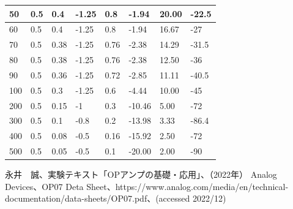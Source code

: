 \documentclass[dvipdfmx,titlepage,a4j]{jsarticle}  %
\begin{document}
\begin{table}[H]
\begin{tabular}{ll|ll|llll}
  \multicolumn{1}{|l|}{50}           & 0.5         & \multicolumn{1}{l|}{0.4}         & -1.25           & \multicolumn{1}{l|}{0.8}     & \multicolumn{1}{l|}{-1.94}           & \multicolumn{1}{l|}{20.00}           & \multicolumn{1}{l|}{-22.5}          \\ \hline
  \multicolumn{1}{|l|}{60}           & 0.5         & \multicolumn{1}{l|}{0.4}         & -1.25           & \multicolumn{1}{l|}{0.8}     & \multicolumn{1}{l|}{-1.94}           & \multicolumn{1}{l|}{16.67}           & \multicolumn{1}{l|}{-27}            \\ \hline
  \multicolumn{1}{|l|}{70}           & 0.5         & \multicolumn{1}{l|}{0.38}        & -1.25           & \multicolumn{1}{l|}{0.76}    & \multicolumn{1}{l|}{-2.38}           & \multicolumn{1}{l|}{14.29}           & \multicolumn{1}{l|}{-31.5}          \\ \hline
  \multicolumn{1}{|l|}{80}           & 0.5         & \multicolumn{1}{l|}{0.38}        & -1.25           & \multicolumn{1}{l|}{0.76}    & \multicolumn{1}{l|}{-2.38}           & \multicolumn{1}{l|}{12.50}           & \multicolumn{1}{l|}{-36}            \\ \hline
  \multicolumn{1}{|l|}{90}           & 0.5         & \multicolumn{1}{l|}{0.36}        & -1.25           & \multicolumn{1}{l|}{0.72}    & \multicolumn{1}{l|}{-2.85}           & \multicolumn{1}{l|}{11.11}           & \multicolumn{1}{l|}{-40.5}          \\ \hline
  \multicolumn{1}{|l|}{100}          & 0.5         & \multicolumn{1}{l|}{0.3}         & -1.25           & \multicolumn{1}{l|}{0.6}     & \multicolumn{1}{l|}{-4.44}           & \multicolumn{1}{l|}{10.00}           & \multicolumn{1}{l|}{-45}            \\ \hline
  \multicolumn{1}{|l|}{200}          & 0.5         & \multicolumn{1}{l|}{0.15}        & -1              & \multicolumn{1}{l|}{0.3}     & \multicolumn{1}{l|}{-10.46}          & \multicolumn{1}{l|}{5.00}            & \multicolumn{1}{l|}{-72}            \\ \hline
  \multicolumn{1}{|l|}{300}          & 0.5         & \multicolumn{1}{l|}{0.1}         & -0.8            & \multicolumn{1}{l|}{0.2}     & \multicolumn{1}{l|}{-13.98}          & \multicolumn{1}{l|}{3.33}            & \multicolumn{1}{l|}{-86.4}          \\ \hline
  \multicolumn{1}{|l|}{400}          & 0.5         & \multicolumn{1}{l|}{0.08}        & -0.5            & \multicolumn{1}{l|}{0.16}    & \multicolumn{1}{l|}{-15.92}          & \multicolumn{1}{l|}{2.50}            & \multicolumn{1}{l|}{-72}            \\ \hline
  \multicolumn{1}{|l|}{500}          & 0.5         & \multicolumn{1}{l|}{0.05}        & -0.5            & \multicolumn{1}{l|}{0.1}     & \multicolumn{1}{l|}{-20.00}          & \multicolumn{1}{l|}{2.00}            & \multicolumn{1}{l|}{-90}   
  \end{tabular}
\end{table}

\begin{thebibliography}{99}
   永井　誠、実験テキスト「OPアンプの基礎・応用」、（2022年）
   Analog Devices、OP07 Deta Sheet、https://www.analog.com/media/en/technical-documentation/data-sheets/OP07.pdf、(accessed 2022/12)
\end{thebibliography}
\end{document}
